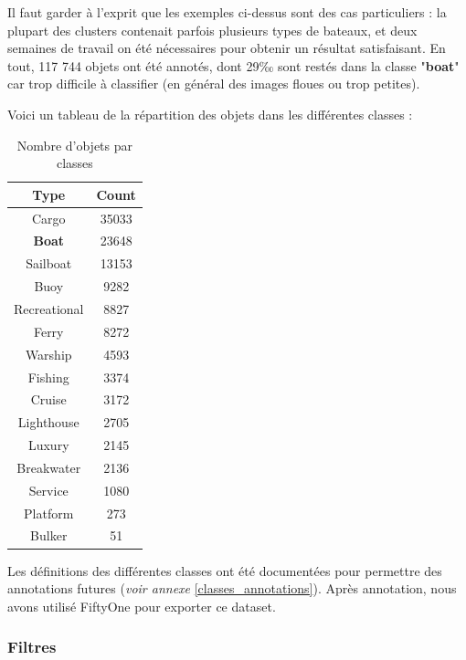 Il faut garder à l'exprit que les exemples ci-dessus sont des cas particuliers : la plupart des 
clusters contenait parfois plusieurs types de bateaux, et deux semaines de travail on été nécessaires 
pour obtenir un résultat satisfaisant. En tout, 117 744 objets ont été annotés, dont 29‰ sont restés
dans la classe "\textbf{boat}" car trop difficile à classifier (en général des images floues ou trop petites). 

Voici un tableau de la répartition des objets dans les différentes classes : \\


\begin{table}[!h]
    \caption{Nombre d'objets par classes}
    \begin{center}
        \begin{tabular}{c c}
            \hline
            Type & Count \\ 
            \hline
            Cargo & 35033 \\ 
            \textbf{Boat} & 23648 \\ 
            Sailboat & 13153 \\ 
            Buoy & 9282 \\ 
            Recreational & 8827 \\ 
            Ferry & 8272 \\ 
            Warship & 4593 \\ 
            Fishing & 3374 \\ 
            Cruise & 3172 \\ 
            Lighthouse & 2705 \\ 
            Luxury & 2145 \\ 
            Breakwater & 2136 \\ 
            Service & 1080 \\ 
            Platform & 273 \\ 
            Bulker & 51 \\ 
        \end{tabular}
    \end{center}
\end{table}

Les définitions des différentes classes ont été documentées pour permettre 
des annotations futures (\textit{voir annexe }\ref{classes_annotations}). 
Après annotation, nous avons utilisé FiftyOne pour exporter ce dataset. 

\subsubsection{Filtres}

